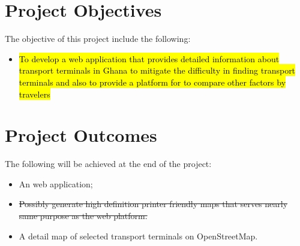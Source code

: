 \documentclass[oneside,12pt]{book}
\begin{document}
\section{Project Objectives}
The objective of this project include the following:
\begin{itemize}
	\item \hl{To develop a web application that provides detailed information about transport terminals in Ghana to mitigate the difficulty in finding transport terminals and also to provide a platform for to compare other factors by travelers}
\end{itemize}

\section{Project Outcomes}
The following will be achieved at the end of the project:
\begin{itemize}
	\item An web application;
	\item \sout{Possibly generate high definition printer friendly maps that serves nearly same purpose as the web platform.}
	\item A detail map of selected transport terminals on OpenStreetMap.
\end{itemize}
\end{document}

